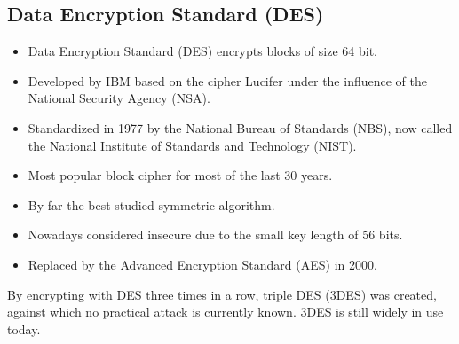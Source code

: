 \documentclass{math}
\begin{document}
\subsection*{Data Encryption Standard (DES)}
\begin{itemize}
  \item Data Encryption Standard (DES) encrypts blocks of size 64 bit.
  \item Developed by IBM based on the cipher Lucifer under the influence of the
  National Security Agency (NSA).
  \item Standardized in 1977 by the National Bureau of Standards (NBS), now
  called the National Institute of Standards and Technology (NIST).
  \item Most popular block cipher for most of the last 30 years.
  \item By far the best studied symmetric algorithm.
  \item Nowadays considered insecure due to the small key length of 56 bits.
  \item Replaced by the Advanced Encryption Standard (AES) in 2000.
\end{itemize}
By encrypting with DES three times in a row, triple DES (3DES) was created,
against which no practical attack is currently known. 3DES is still widely in
use today.
\end{document}
